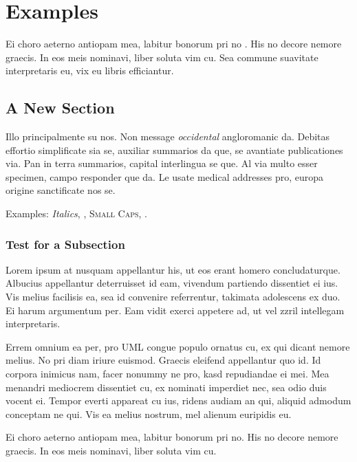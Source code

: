 \chapter{Examples}\label{ch:examples}
Ei choro aeterno antiopam mea, labitur bonorum pri no 
\citeauthor{dueck:trio} \citep{dueck:trio}. His no decore
nemore graecis. In eos meis nominavi, liber soluta vim cu. Sea commune
suavitate interpretaris eu, vix eu libris efficiantur.
\section{A New Section}
Illo principalmente su nos. Non message \emph{occidental} angloromanic
da. Debitas effortio simplificate sia se, auxiliar summarios da que,
se avantiate publicationes via. Pan in terra summarios, capital
interlingua se que. Al via multo esser specimen, campo responder que
da. Le usate medical addresses pro, europa origine sanctificate nos
se.

Examples: \textit{Italics}, , \textsc{Small
Caps}, .

\subsection{Test for a Subsection}
Lorem ipsum at nusquam appellantur his, ut eos erant homero
concludaturque. Albucius appellantur deterruisset id eam, vivendum
partiendo dissentiet ei ius. Vis melius facilisis ea, sea id convenire
referrentur, takimata adolescens ex duo. Ei harum argumentum per. Eam
vidit exerci appetere ad, ut vel zzril intellegam interpretaris.

Errem omnium ea per, pro \ac{UML} congue populo ornatus cu, ex qui
dicant nemore melius. No pri diam iriure euismod. Graecis eleifend
appellantur quo id. Id corpora inimicus nam, facer nonummy ne pro,
kasd repudiandae ei mei. Mea menandri mediocrem dissentiet cu, ex
nominati imperdiet nec, sea odio duis vocent ei. Tempor everti
appareat cu ius, ridens audiam an qui, aliquid admodum conceptam ne
qui. Vis ea melius nostrum, mel alienum euripidis eu.

Ei choro aeterno antiopam mea, labitur bonorum pri no. His no decore
nemore graecis. In eos meis nominavi, liber soluta vim cu.

